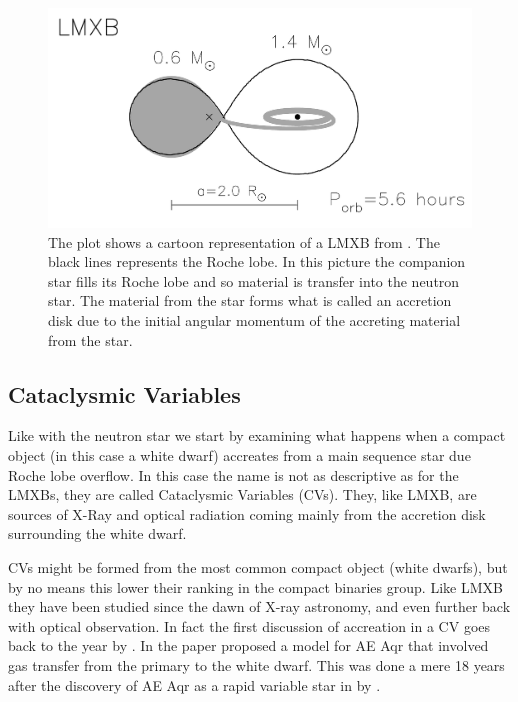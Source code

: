 \begin{figure}[]
        \centering
\includegraphics[scale=.3]{assets/images/lmxb1.png}
\caption{The plot shows a cartoon representation of a LMXB from \cite{lmxb1}. The black lines represents the Roche lobe. In this picture the companion star fills its Roche lobe and so material is transfer into the neutron star. The material from the star forms what is called an accretion disk due to the initial angular momentum of the accreting material from the star. }
\label{fig:lmxb1}
\end{figure}

\subsection{Cataclysmic Variables}

Like with the neutron star we start by examining what happens when a compact object (in this case a white dwarf) accreates from a main sequence star due Roche lobe overflow. In this case the name is not as descriptive as for the LMXBs, they are called Cataclysmic Variables (CVs). They, like LMXB, are sources of X-Ray and optical radiation coming mainly from the accretion disk surrounding the white dwarf. 

CVs might be formed from the most common compact object (white dwarfs), but by no means this lower their ranking in the compact binaries group. Like LMXB they have been studied since the dawn of X-ray astronomy, and even further back with optical observation. In fact the first discussion of accreation in a CV goes back to the year \citeyear{crawford_intrepretation_1956} by \citeauthor{crawford_intrepretation_1956}. In the paper \citeauthor{crawford_intrepretation_1956} proposed a model for AE Aqr that involved gas transfer from the primary to the white dwarf. This was done a mere 18 years after the discovery of AE Aqr as a rapid variable star in \citeyear{zinner_mitteilungen_1938} by \citeauthor{zinner_mitteilungen_1938}.  

